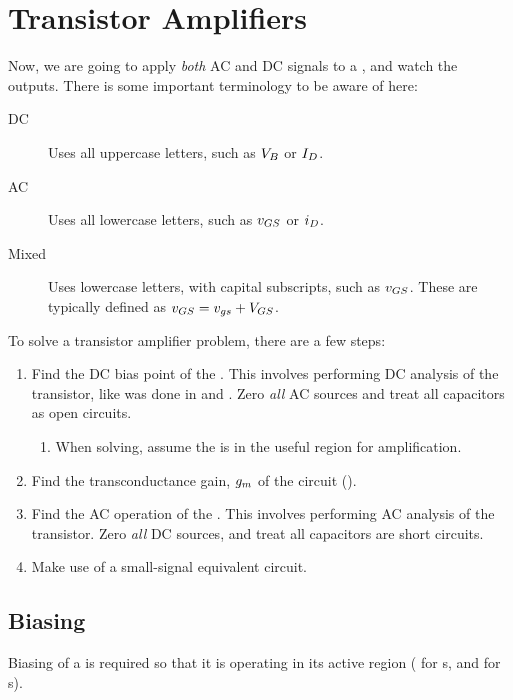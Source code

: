 \section{Transistor Amplifiers}\label{sec:Transistor_Amps}
Now, we are going to apply \emph{both} AC and DC signals to a , and watch the outputs.
There is some important terminology to be aware of here:
\begin{description}
\item[DC] Uses all uppercase letters, such as $\DCVoltage{\Base}$ or $\DCCurrent{\Drain}$.
\item[AC] Uses all lowercase letters, such as $\ACVoltage{\Gate\Source}$ or $\ACCurrent{\Drain}$.
\item[Mixed] Uses lowercase letters, with capital subscripts, such as $\SignalVoltage{GS}$.
  These are typically defined as $\SignalVoltage{GS} = \ACVoltage{GS} + \DCVoltage{GS}$.
\end{description}

To solve a transistor amplifier problem, there are a few steps:
\begin{enumerate}[noitemsep]
\item Find the DC bias point of the .
  This involves performing DC analysis of the transistor, like was done in  and .
  Zero \emph{all} AC sources and treat all capacitors as open circuits.
  \begin{enumerate}[noitemsep]
  \item When solving, assume the  is in the useful region for amplification.
  \end{enumerate}
\item Find the transconductance gain, $g_{m}$ of the circuit ().
\item Find the AC operation of the .
  This involves performing AC analysis of the transistor.
  Zero \emph{all} DC sources, and treat all capacitors are short circuits.
\item Make use of a small-signal equivalent circuit.
\end{enumerate}

\subsection{Biasing}\label{subsec:Biasing}
Biasing of a  is required so that it is operating in its active region ( for s, and  for s).

